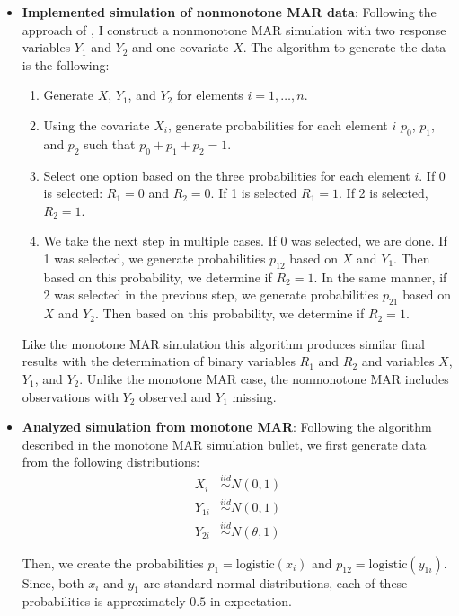 \documentclass[12pt]{article}
\newcommand{\logistic}{{\text{logistic}}}
\begin{document}
\begin{itemize}
  \item \textbf{Implemented simulation of nonmonotone MAR data}: 
  Following the approach
    of \cite{robins1997non}, I construct a nonmonotone MAR simulation with two 
    response variables $Y_1$ and $Y_2$ and one covariate $X$. The algorithm to
    generate the data is the following:
    \begin{enumerate}
        \item Generate $X$, $Y_1$, and $Y_2$ for elements $i = 1, \dots, n$.
        \item Using the covariate $X_i$, generate probabilities for each element $i$
        $p_0$, $p_1$, and $p_2$ such that $p_0 + p_1 + p_2 = 1$. 
        \item Select one option based on the three probabilities for each element $i$.
        If 0 is selected: $R_1 = 0$ and $R_2 = 0$. If 1 is selected $R_1 = 1$. If 
        2 is selected, $R_2 = 1$.
        \item We take the next step in multiple cases. If 0 was selected, we are done.
        If 1 was selected, we generate probabilities $p_{12}$ based on $X$ and $Y_1$.
        Then based on this probability, we determine if $R_2 = 1$. In the same manner,
        if 2 was selected in the previous step, we generate probabilities $p_{21}$
        based on $X$ and $Y_2$. Then based on this probability, we determine if $R_2 = 1$.
    \end{enumerate}
    Like the monotone MAR simulation this algorithm produces similar final results
    with the determination of binary variables 
    $R_1$ and $R_2$ and variables $X$, $Y_1$, and $Y_2$. Unlike the monotone MAR case,
    the nonmonotone MAR includes observations with $Y_2$ observed and $Y_1$ missing.
    
    \item \textbf{Analyzed simulation from monotone MAR}:
    Following the algorithm described in the monotone MAR simulation bullet, 
    we first generate data from the following distributions:
    \begin{align*}
        X_i &\stackrel{iid}{\sim} N(0, 1) \\
        Y_{1i} &\stackrel{iid}{\sim} N(0, 1)\\
        Y_{2i} &\stackrel{iid}{\sim} N(\theta, 1)
    \end{align*}

    Then, we create the probabilities $p_1 = \logistic(x_i)$ and 
    $p_{12} = \logistic(y_{1i})$.
    Since, both $x_i$ and $y_1$ are standard normal distributions, each of these
    probabilities is approximately $0.5$ in expectation.


\end{itemize}
\end{document}
